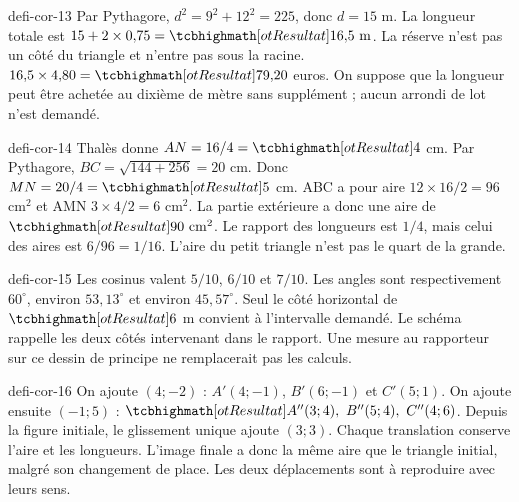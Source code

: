 \begin{blocEdition}{defi-cor-13}
Par Pythagore, $d^2=9^2+12^2=225$, donc $d=15$ m.
La longueur totale est $15+2\times0{,}75=\res{16{,}5\ \mathrm m}$. La réserve n’est pas un côté du triangle et n’entre pas sous la racine.
$16{,}5\times4{,}80=\res{79{,}20}$ euros. On suppose que la longueur peut être achetée au dixième de mètre sans supplément ; aucun arrondi de lot n’est demandé.\label{fig-defi-cor-13}

\end{blocEdition}
\begin{blocEdition}{defi-cor-14}
Thalès donne $AN=16/4=\res4$ cm. Par Pythagore, $BC=\sqrt{144+256}=20$ cm. Donc $MN=20/4=\res5$ cm.
ABC a pour aire $12\times16/2=96$ cm$^2$ et AMN $3\times4/2=6$ cm$^2$. La partie extérieure a donc une aire de $\res{90\ \mathrm{cm}^2}$.
Le rapport des longueurs est $1/4$, mais celui des aires est $6/96=1/16$. L’aire du petit triangle n’est pas le quart de la grande.\label{fig-defi-cor-14}

\end{blocEdition}
\begin{blocEdition}{defi-cor-15}
Les cosinus valent $5/10$, $6/10$ et $7/10$.
Les angles sont respectivement $60^\circ$, environ $53{,}13^\circ$ et environ $45{,}57^\circ$.
Seul le côté horizontal de $\res6$ m convient à l’intervalle demandé. Le schéma rappelle les deux côtés intervenant dans le rapport. Une mesure au rapporteur sur ce dessin de principe ne remplacerait pas les calculs.\label{fig-defi-cor-15}

\end{blocEdition}
\begin{blocEdition}{defi-cor-16}
On ajoute $(4;-2)$ : $A'(4;-1)$, $B'(6;-1)$ et $C'(5;1)$.
On ajoute ensuite $(-1;5)$ : $\res{A''(3;4),\ B''(5;4),\ C''(4;6)}$. Depuis la figure initiale, le glissement unique ajoute $(3;3)$.
Chaque translation conserve l’aire et les longueurs. L’image finale a donc la même aire que le triangle initial, malgré son changement de place. Les deux déplacements sont à reproduire avec leurs sens.\label{fig-defi-cor-16}

\end{blocEdition}

